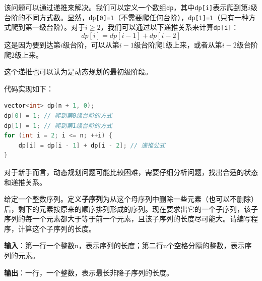 \documentclass{article}
\begin{document}
\begin{soln}
  该问题可以通过递推来解决。我们可以定义一个数组\texttt{dp}，其中\texttt{dp[i]}表示爬到第$i$级台阶的不同方式数。显然，\texttt{dp[0]=1}（不需要爬任何台阶），\texttt{dp[1]=1}（只有一种方式爬到第一级台阶）。对于$i \geq 2$，我们可以通过以下递推关系来计算\texttt{dp[i]}：
  $$dp[i] = dp[i-1] + dp[i-2]$$
  这是因为要到达第$i$级台阶，可以从第$i-1$级台阶爬1级上来，或者从第$i-2$级台阶爬2级上来。

  这个递推也可以认为是动态规划的最初级阶段。

  代码实现如下：
\begin{lstlisting}[language=C++]
vector<int> dp(n + 1, 0);
dp[0] = 1; // 爬到第0级台阶的方式
dp[1] = 1; // 爬到第1级台阶的方式
for (int i = 2; i <= n; ++i) {
    dp[i] = dp[i - 1] + dp[i - 2]; // 递推公式
}
\end{lstlisting}
\end{soln}

对于新手而言，动态规划问题可能比较困难，需要仔细分析问题，找出合适的状态和递推关系。

\begin{example}
  给定一个整数序列。定义\textbf{子序列}为从这个母序列中删除一些元素（也可以不删除）后，剩下的元素按原来的顺序排列形成的序列。现在要求出它的一个子序列，该子序列的每一个元素都大于等于前一个元素，且该子序列的长度尽可能大。请编写程序，计算这个子序列的长度。

  \textbf{输入}：第一行一个整数n，表示序列的长度；第二行n个空格分隔的整数，表示序列的元素。

  \textbf{输出}：一行，一个整数，表示最长非降子序列的长度。
\end{example}
\end{document}
